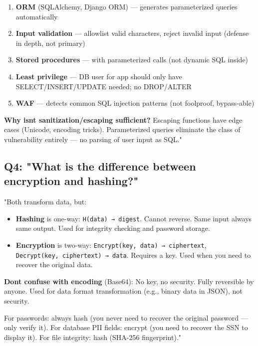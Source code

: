 \documentclass[11pt]{article}
\providecommand{\tightlist}{\setlength{\itemsep}{1pt}\setlength{\parskip}{0pt}}
\begin{document}
\begin{enumerate}
\def\labelenumi{\arabic{enumi}.}
\setcounter{enumi}{1}
\tightlist
\item
  \textbf{ORM} (SQLAlchemy, Django ORM) --- generates parameterized queries automatically
\item
  \textbf{Input validation} --- allowlist valid characters, reject invalid input (defense in depth, not primary)
\item
  \textbf{Stored procedures} --- with parameterized calls (not dynamic SQL inside)
\item
  \textbf{Least privilege} --- DB user for app should only have SELECT/INSERT/UPDATE needed; no DROP/ALTER
\item
  \textbf{WAF} --- detects common SQL injection patterns (not foolproof, bypass-able)
\end{enumerate}

\textbf{Why isn\textquotesingle t sanitization/escaping sufficient?}
Escaping functions have edge cases (Unicode, encoding tricks). Parameterized queries eliminate the class of vulnerability entirely --- no parsing of user input as SQL."

\subsection{Q4: "What is the difference between encryption and hashing?"}\label{q4-what-is-the-difference-between-encryption-and-hashing}

"Both transform data, but:

\begin{itemize}
\tightlist
\item
  \textbf{Hashing} is one-way: \texttt{H(data)\ →\ digest}. Cannot reverse. Same input always same output. Used for integrity checking and password storage.
\item
  \textbf{Encryption} is two-way: \texttt{Encrypt(key,\ data)\ →\ ciphertext}, \texttt{Decrypt(key,\ ciphertext)\ →\ data}. Requires a key. Used when you need to recover the original data.
\end{itemize}

\textbf{Don\textquotesingle t confuse with encoding} (Base64): No key, no security. Fully reversible by anyone. Used for data format transformation (e.g., binary data in JSON), not security.

For passwords: always hash (you never need to recover the original password --- only verify it). For database PII fields: encrypt (you need to recover the SSN to display it). For file integrity: hash (SHA-256 fingerprint)."
\end{document}
